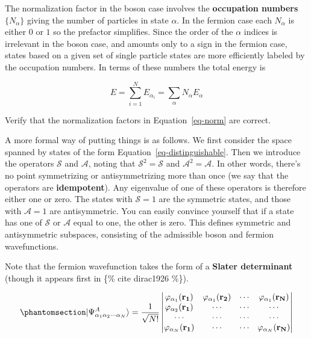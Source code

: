\documentclass[
  letterpaper,
  DIV=11,
  numbers=noendperiod]{scrreprt}
\begin{document}
The normalization factor in the boson case involves the
\textbf{occupation numbers} \(\{N_{\alpha}\}\) giving the number of
particles in state \(\alpha\). In the fermion case each \(N_{\alpha}\)
is either \(0\) or \(1\) so the prefactor simplifies. Since the order of
the \(\alpha\) indices is irrelevant in the boson case, and amounts only
to a sign in the fermion case, states based on a given set of single
particle states are more efficiently labeled by the occupation numbers.
In terms of these numbers the total energy is

\[
 \label{quantum_statistics_TotalEnergy}
 E=\sum_{i=1}^{N}E_{\alpha_{i}}=\sum_{\alpha}N_{\alpha} E_{\alpha}
\]

\begin{tcolorbox}[enhanced jigsaw, colback=white, bottomrule=.15mm, left=2mm, colbacktitle=quarto-callout-tip-color!10!white, breakable, colframe=quarto-callout-tip-color-frame, leftrule=.75mm, opacitybacktitle=0.6, opacityback=0, bottomtitle=1mm, toptitle=1mm, titlerule=0mm, title=\textcolor{quarto-callout-tip-color}{\faLightbulb}\hspace{0.5em}{Check}, toprule=.15mm, arc=.35mm, coltitle=black, rightrule=.15mm]

Verify that the normalization factors in Equation~\ref{eq-norm} are
correct.

\end{tcolorbox}

A more formal way of putting things is as follows. We first consider the
space spanned by states of the form Equation~\ref{eq-distinguishable}.
Then we introduce the operators \(\mathcal{S}\) and \(\mathcal{A}\),
noting that \(\mathcal{S}^{2}=\mathcal{S}\) and
\(\mathcal{A}^{2}=\mathcal{A}\). In other words, there's no point
symmetrizing or antisymmetrizing more than once (we say that the
operators are \textbf{idempotent}). Any eigenvalue of one of these
operators is therefore either one or zero. The states with
\(\mathcal{S}=1\) are the symmetric states, and those with
\(\mathcal{A}=1\) are antisymmetric. You can easily convince yourself
that if a state has one of \(\mathcal{S}\) or \(\mathcal{A}\) equal to
one, the other is zero. This defines symmetric and antisymmetric
subspaces, consisting of the admissible boson and fermion wavefunctions.

Note that the fermion wavefunction takes the form of a \textbf{Slater
determinant} (though it appears first in \{\% cite dirac1926 \%\}).

\begin{equation}\phantomsection\label{eq-slater}{
   \lvert{\Psi^{A}_{\alpha_{1}\alpha_{2}\cdots\alpha_{N}}}\rangle=\frac{1}{\sqrt{N!}}\begin{vmatrix}
   \varphi_{\alpha_{1}}(\mathbf{r_{1}}) &   \varphi_{\alpha_{1}}(\mathbf{r_{2}}) & \cdots & \varphi_{\alpha_{1}}(\mathbf{r_{N}}) \\
   \varphi_{\alpha_{2}}(\mathbf{r_{1}}) &  \cdots & \cdots & \cdots  \\
   \cdots & \cdots & \cdots & \cdots  \\
   \varphi_{\alpha_{N}}(\mathbf{r_{1}}) &  \cdots & \cdots & \varphi_{\alpha_{N}}(\mathbf{r_{N}})
 \end{vmatrix}
}\end{equation}
\end{document}
